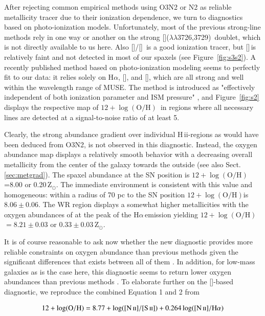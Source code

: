 \documentclass[traditabstract]{aa}
\newcommand{\ha}{H$\alpha$}
\newcommand{\hii}{\mbox{H\,{\sc ii}}}
\newcommand{\oh}{$12+\log(\mathrm{O/H})$}
\newcommand{\sii}{[\ion{S}{ii}]}
\newcommand{\siii}{[\ion{S}{iii}]}
\newcommand{\oii}{[\ion{O}{ii}]}
\newcommand{\nii}{[\ion{N}{ii}]}
\begin{document}
After rejecting common empirical methods using O3N2 or N2 as reliable metallicity tracer due to their ionization dependence, we turn to diagnostics based on photo-ionization models. Unfortunately, most of the previous strong-line methods rely in one way or another on the strong \oii($\lambda\lambda$3726,3729)\, doublet\citep{2002ApJS..142...35K}, which is not directly available to us here. Also \siii/\sii\, is a good ionization tracer, but \siii\,is relatively faint and not detected in most of our spaxels (see Figure~\ref{fig:s3s2}). A recently published method based on photo-ionization modeling \citep{2016Ap&SS.361...61D} seems to perfectly fit to our data: it relies solely on \ha, \nii, and \sii, which are all strong and well within the wavelength range of MUSE. The method is introduced as "effectively independent of both ionization parameter and ISM pressure" \citep{2016Ap&SS.361...61D}, and Figure~\ref{fig:s2} displays the respective map of \oh\, in regions where all necessary lines are detected at a signal-to-noise ratio of at least 5.

Clearly, the strong abundance gradient over individual \hii-regions as would have been deduced from O3N2, is not observed in this diagnostic. Instead, the oxygen abundance map displays a relatively smooth behavior with a decreasing overall metallicity from the center of the galaxy towards the outside (see also Sect. \ref{sec:metgrad}). The spaxel abundance at the SN position is \oh=8.00 or 0.20\,Z$_{\odot}$. The immediate environment is consistent with this value and homogeneous: within a radius of 70 pc to the SN position \oh is $8.06\pm 0.06$. The WR region displays a somewhat higher metallicities with the oxygen abundances of at the peak of the \ha\,emission yielding \oh$=8.21\pm 0.03$ or $0.33\pm0.03\,$Z$_{\odot}$.

It is of course reasonable to ask now whether the new \citet{2016Ap&SS.361...61D} diagnostic provides more reliable constraints on oxygen abundance than previous methods given the significant differences that exists between all of them \citep{2016arXiv161108595B}. In addition, for low-mass galaxies as is the case here, this diagnostic seems to return lower oxygen abundances than previous methods \citep{2016ApJ...823L..24K}. To elaborate further on the \sii-based diagnostic, we reproduce the combined Equation 1 and 2 from \citet{2016Ap&SS.361...61D}

\begin{equation}
12+\log(\mathrm{O/H}) = 8.77 + \log([\ion{N}{ii}]/[\ion{S}{ii}]) + 0.264\log([\ion{N}{ii}]/\mathrm{H}\alpha)
\end{equation}
\end{document}

